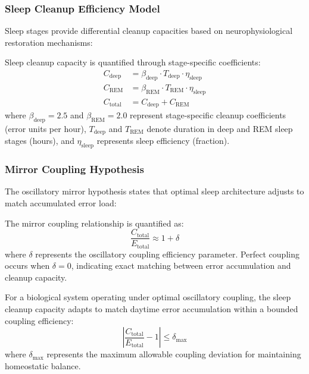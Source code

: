 \subsubsection{Sleep Cleanup Efficiency Model}

Sleep stages provide differential cleanup capacities based on neurophysiological restoration mechanisms:

\begin{definition}
Sleep cleanup capacity is quantified through stage-specific coefficients:
\begin{align}
C_{\text{deep}} &= \beta_{\text{deep}} \cdot T_{\text{deep}} \cdot \eta_{\text{sleep}} \\
C_{\text{REM}} &= \beta_{\text{REM}} \cdot T_{\text{REM}} \cdot \eta_{\text{sleep}} \\
C_{\text{total}} &= C_{\text{deep}} + C_{\text{REM}}
\label{eq:cleanup_capacity}
\end{align}
where $\beta_{\text{deep}} = 2.5$ and $\beta_{\text{REM}} = 2.0$ represent stage-specific cleanup coefficients (error units per hour), $T_{\text{deep}}$ and $T_{\text{REM}}$ denote duration in deep and REM sleep stages (hours), and $\eta_{\text{sleep}}$ represents sleep efficiency (fraction).
\end{definition}

\subsubsection{Mirror Coupling Hypothesis}

The oscillatory mirror hypothesis states that optimal sleep architecture adjusts to match accumulated error load:

\begin{definition}
The mirror coupling relationship is quantified as:
\begin{equation}
\frac{C_{\text{total}}}{E_{\text{total}}} \approx 1 + \delta
\label{eq:mirror_coefficient}
\end{equation}
where $\delta$ represents the oscillatory coupling efficiency parameter. Perfect coupling occurs when $\delta = 0$, indicating exact matching between error accumulation and cleanup capacity.
\end{definition}

\begin{theorem}
For a biological system operating under optimal oscillatory coupling, the sleep cleanup capacity adapts to match daytime error accumulation within a bounded coupling efficiency:
\begin{equation}
\left| \frac{C_{\text{total}}}{E_{\text{total}}} - 1 \right| \leq \delta_{\text{max}}
\end{equation}
where $\delta_{\text{max}}$ represents the maximum allowable coupling deviation for maintaining homeostatic balance.
\end{theorem}

